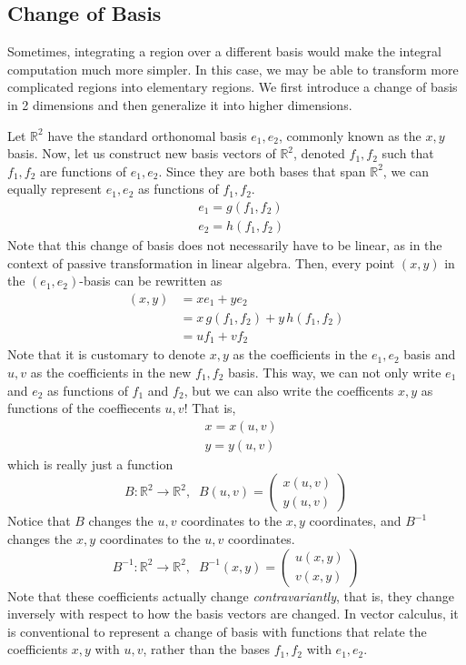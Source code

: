 \subsection{Change of Basis}

  Sometimes, integrating a region over a different basis would make the integral computation much more simpler. In this case, we may be able to transform more complicated regions into elementary regions. We first introduce a change of basis in 2 dimensions and then generalize it into higher dimensions. 
  
  Let $\mathbb{R}^2$ have the standard orthonomal basis $e_1, e_2$, commonly known as the $x, y$ basis. Now, let us construct new basis vectors of $\mathbb{R}^2$, denoted $f_1, f_2$ such that $f_1, f_2$ are functions of $e_1, e_2$. Since they are both bases that span $\mathbb{R}^2$, we can equally represent $e_1, e_2$ as functions of $f_1, f_2$. 
  \begin{align*}
      &e_1 = g(f_1, f_2)\\
      &e_2 = h(f_1, f_2) 
  \end{align*}
  Note that this change of basis does not necessarily have to be linear, as in the context of passive transformation in linear algebra. Then, every point $(x,y)$ in the $(e_1, e_2)$-basis can be rewritten as
  \begin{align*}
      (x, y) & = x e_1 + y e_2 \\
      & = x \, g(f_1, f_2) + y \, h(f_1, f_2) \\
      & = u f_1 + v f_2
  \end{align*}
  Note that it is customary to denote $x, y$ as the coefficients in the $e_1, e_2$ basis and $u, v$ as the coefficients in the new $f_1, f_2$ basis. This way, we can not only write $e_1$ and $e_2$ as functions of $f_1$ and $f_2$, but we can also write the coefficents $x, y$ as functions of the coeffiecents $u, v$! That is, 
  \begin{align*}
      & x = x(u, v) \\
      & y = y(u, v)
  \end{align*}
  which is really just a function 
  \[B: \mathbb{R}^2 \longrightarrow \mathbb{R}^2, \;\; B(u, v) = \begin{pmatrix} x(u, v) \\ y(u, v) \end{pmatrix}\]
  Notice that $B$ changes the $u, v$ coordinates to the $x, y$ coordinates, and $B^{-1}$ changes the $x, y$ coordinates to the $u, v$ coordinates. 
  \[B^{-1}: \mathbb{R}^2 \longrightarrow \mathbb{R}^2, \;\; B^{-1} (x, y) = \begin{pmatrix} u (x, y) \\ v (x, y) \end{pmatrix}\]
  Note that these coefficients actually change \textit{contravariantly}, that is, they change inversely with respect to how the basis vectors are changed. In vector calculus, it is conventional to represent a change of basis with functions that relate the coefficients $x, y$ with $u, v$, rather than the bases $f_1, f_2$ with $e_1, e_2$. 

